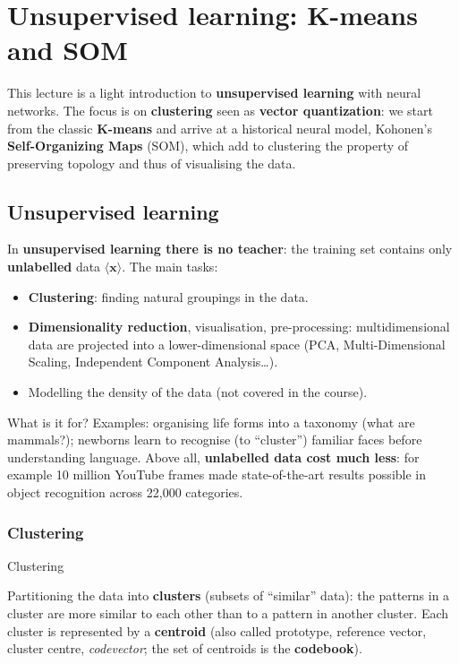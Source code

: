 \chapter{Unsupervised learning: K-means and SOM}\label{ch-19}

This lecture is a light introduction to \textbf{unsupervised learning}
with neural networks. The focus is on \textbf{clustering} seen as
\textbf{vector quantization}: we start from the classic
\textbf{K-means} and arrive at a historical neural model, Kohonen's
\textbf{Self-Organizing Maps} (SOM), which add to clustering the
property of preserving topology and thus of visualising the data.

\section{Unsupervised
learning}\label{apprendimento-non-supervisionato}

In \textbf{unsupervised learning there is no teacher}: the training set
contains only \textbf{unlabelled} data \(\langle \mathbf{x}\rangle\).
The main tasks:

\begin{itemize}
\tightlist
\item
  \textbf{Clustering}: finding natural groupings in the data.
\item
  \textbf{Dimensionality reduction}, visualisation, pre-processing:
  multidimensional data are projected into a lower-dimensional space
  (PCA, Multi-Dimensional Scaling, Independent Component
  Analysis\ldots).
\item
  Modelling the density of the data (not covered in the course).
\end{itemize}

What is it for? Examples: organising life forms into a taxonomy (what
are mammals?); newborns learn to recognise (to ``cluster'') familiar
faces before understanding language. Above all, \textbf{unlabelled
data cost much less}: for example 10 million YouTube frames made
state-of-the-art results possible in object recognition across 22,000
categories.

\subsection{Clustering}\label{clustering}

\begin{boxdefinition}{Clustering}

Partitioning the data into \textbf{clusters} (subsets of ``similar''
data): the patterns in a cluster are more similar to each other than to
a pattern in another cluster. Each cluster is represented by a
\textbf{centroid} (also called prototype, reference vector, cluster
centre, \emph{codevector}; the set of centroids is the
\textbf{codebook}).

\end{boxdefinition}

